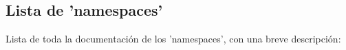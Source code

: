 \subsection{\-Lista de 'namespaces'}
\-Lista de toda la documentación de los 'namespaces', con una breve descripción\-:\begin{DoxyCompactList}
\item{}
\end{DoxyCompactList}
